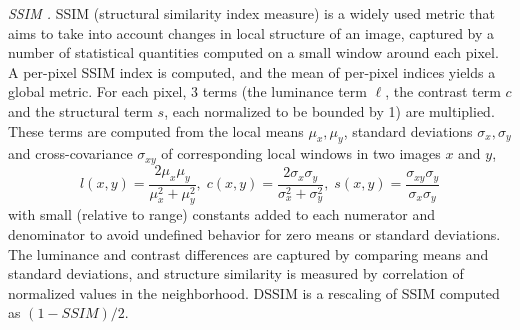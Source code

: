 \noindent\emph{SSIM \cite{wang2004image}.}  SSIM (structural similarity index measure) is a widely used metric 
that aims to take into account changes in local structure of an image, captured by a number of statistical quantities 
computed on a small window around each pixel. A per-pixel SSIM index is computed,  and the mean of per-pixel indices 
yields a global metric. For each pixel, 3 terms (the luminance term $\ell$, the contrast term $c$ and the structural term $s$, each normalized to be bounded by 1) 
are multiplied.  These terms are computed from the local means 
$\mu_x,\mu_y$, standard deviations $\sigma_x,\sigma_y$ and cross-covariance $\sigma_{xy}$ of corresponding local windows in two images $x$ and $y$, 
\begin{equation*}
    l(x,y) = \frac{2\mu_x \mu_y}{\mu_x^2 + \mu_y^2},\;
    c(x,y) = \frac{2\sigma_x \sigma_y}{\sigma_x^2 + \sigma_y^2},\;
    s(x,y) = \frac{\sigma_{xy} \sigma_y}{\sigma_x\sigma_y}
\end{equation*}
with small (relative to range) constants added to each numerator and denominator to avoid undefined behavior  for zero means or standard deviations. The luminance and contrast differences are captured by comparing means and standard deviations, and structure similarity is measured by correlation of normalized values in the neighborhood. DSSIM is a rescaling of SSIM computed as $(1-SSIM)/2$.




